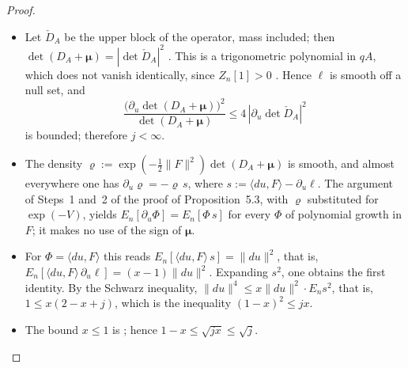 \documentclass[11pt]{amsart}
\theoremstyle{definition}
\begin{document}
\begin{proof}
\begin{itemize}
\item[1.] Let $\check D_A$ be the upper block of the operator, mass included; then $\det(D_A+\boldsymbol\mu)=|\det\check D_A|^2$ \cite[Proposition~3.18\,(d)]{QEDII}.
This is a trigonometric polynomial in $qA$, which does not vanish identically, since $Z_n[1]>0$ \cite[Theorem~4.26]{QEDII}.
Hence $\ell$ is smooth off a null set, and
\begin{equation*}
\frac{\bigl(\partial_u\det(D_A+\boldsymbol\mu)\bigr)^2}{\det(D_A+\boldsymbol\mu)}\le4\,|\partial_u\det\check D_A|^2
\end{equation*}
is bounded; therefore $j<\infty$.
\item[2.] The density $\varrho:=\exp(-\frac12\|F\|^2)\det(D_A+\boldsymbol\mu)$ is smooth, and almost everywhere one has $\partial_u\varrho=-\varrho\,s$, where $s:=\langle du,F\rangle-\partial_u\ell$.
The argument of Steps~1 and~2 of the proof of Proposition~5.3, with $\varrho$ substituted for $\exp(-V)$, yields $E_n[\partial_u\Phi]=E_n[\Phi\,s]$ for every $\Phi$ of polynomial growth in $F$; it makes no use of the sign of $\boldsymbol\mu$.
\item[3.] For $\Phi=\langle du,F\rangle$ this reads $E_n[\langle du,F\rangle\,s]=\|du\|^2$, that is, $E_n[\langle du,F\rangle\,\partial_u\ell]=(x-1)\|du\|^2$.
Expanding $s^2$, one obtains the first identity.
By the Schwarz inequality, $\|du\|^4\le x\|du\|^2\cdot E_ns^2$, that is, $1\le x(2-x+j)$, which is the inequality $(1-x)^2\le jx$.
\item[4.] The bound $x\le1$ is \cite[Theorem~6.27\,(b)]{QEDII}; hence $1-x\le\sqrt{jx}\le\sqrt j$.
\qedhere
\end{itemize}
\end{proof}
\end{document}
